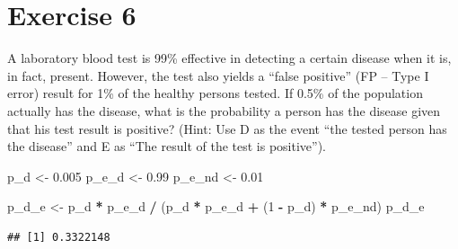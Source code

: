 \documentclass[
]{article}
\newenvironment{Shaded}{\begin{snugshade}}{\end{snugshade}}
\newcommand{\DecValTok}[1]{\textcolor[rgb]{0.00,0.00,0.81}{#1}}
\newcommand{\FloatTok}[1]{\textcolor[rgb]{0.00,0.00,0.81}{#1}}
\newcommand{\NormalTok}[1]{#1}
\newcommand{\OperatorTok}[1]{\textcolor[rgb]{0.81,0.36,0.00}{\textbf{#1}}}
\newcommand{\StringTok}[1]{\textcolor[rgb]{0.31,0.60,0.02}{#1}}
\begin{document}
\hypertarget{exercise-6}{%
\section{Exercise 6}\label{exercise-6}}

A laboratory blood test is 99\% effective in detecting a certain disease
when it is, in fact, present. However, the test also yields a ``false
positive'' (FP -- Type I error) result for 1\% of the healthy persons
tested. If 0.5\% of the population actually has the disease, what is the
probability a person has the disease given that his test result is
positive? (Hint: Use D as the event ``the tested person has the
disease'' and E as ``The result of the test is positive'').

\begin{Shaded}
\begin{Highlighting}[]
\NormalTok{p\_d \textless{}{-}}\StringTok{ }\FloatTok{0.005}
\NormalTok{p\_e\_d \textless{}{-}}\StringTok{ }\FloatTok{0.99}
\NormalTok{p\_e\_nd \textless{}{-}}\StringTok{ }\FloatTok{0.01}

\NormalTok{p\_d\_e \textless{}{-}}\StringTok{ }\NormalTok{p\_d }\OperatorTok{*}\StringTok{ }\NormalTok{p\_e\_d }\OperatorTok{/}\StringTok{ }\NormalTok{(p\_d }\OperatorTok{*}\StringTok{ }\NormalTok{p\_e\_d }\OperatorTok{+}\StringTok{ }\NormalTok{(}\DecValTok{1} \OperatorTok{{-}}\StringTok{ }\NormalTok{p\_d) }\OperatorTok{*}\StringTok{ }\NormalTok{p\_e\_nd)}
\NormalTok{p\_d\_e}
\end{Highlighting}
\end{Shaded}

\begin{verbatim}
## [1] 0.3322148
\end{verbatim}
\end{document}
